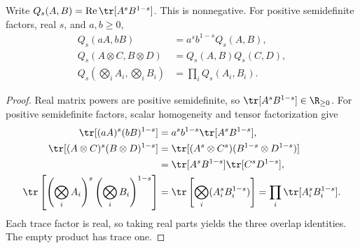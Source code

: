 \begin{theorem}
    \label{thm:testing_overlap_products}
    \leanok
    Write $Q_s(A,B)=\operatorname{Re}\tr[A^sB^{1-s}]$. This is nonnegative.
    For positive semidefinite factors, real $s$, and $a,b\ge0$,
    \begin{align}
        Q_s(aA,bB)&=a^sb^{1-s}Q_s(A,B),\\
        Q_s(A\otimes C,B\otimes D)&=Q_s(A,B)Q_s(C,D),\\
        Q_s\left(\bigotimes_i A_i,\bigotimes_i B_i\right)
          &=\prod_i Q_s(A_i,B_i).
    \end{align}
\end{theorem}
\begin{proof}
    \leanok
    Real matrix powers are positive semidefinite, so
    $\tr[A^sB^{1-s}]\in\R_{\ge0}$. For positive semidefinite factors,
    scalar homogeneity and tensor factorization give
    \begin{align}
        \tr[(aA)^s(bB)^{1-s}]
          &=a^sb^{1-s}\tr[A^sB^{1-s}],\\
        \tr[(A\otimes C)^s(B\otimes D)^{1-s}]
          &=\tr[(A^s\otimes C^s)(B^{1-s}\otimes D^{1-s})]\\
          &=\tr[A^sB^{1-s}]\tr[C^sD^{1-s}],\\
        \tr\left[\left(\bigotimes_i A_i\right)^s
            \left(\bigotimes_i B_i\right)^{1-s}\right]
          &=\tr\left[\bigotimes_i(A_i^sB_i^{1-s})\right]
           =\prod_i\tr[A_i^sB_i^{1-s}].
    \end{align}
    Each trace factor is real, so taking real parts yields the three
    overlap identities. The empty product has trace one.
\end{proof}

